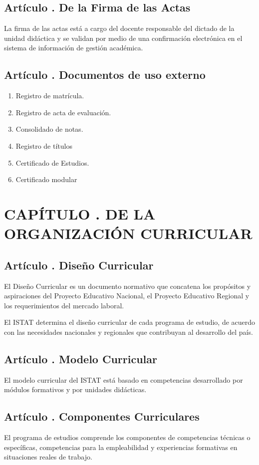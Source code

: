 \subsection{Artículo . De la Firma de las Actas}
\addtocounter{ns}{1}
La firma de las actas está a cargo del docente responsable del dictado de la unidad didáctica y se validan por medio de una confirmación electrónica en el sistema de información de gestión académica. 
\subsection{Artículo . Documentos de uso externo}
\addtocounter{ns}{1}
\begin{enumerate}
\item Registro de matrícula. 
\item Registro de acta de evaluación. 
\item Consolidado de notas. 
\item Registro de títulos 
\item Certificado de Estudios. 
\item Certificado modular
\end{enumerate}
\section{CAPÍTULO . DE LA ORGANIZACIÓN CURRICULAR}
\addtocounter{re}{1}

\subsection{Artículo . Diseño Curricular}
\addtocounter{ns}{1}
El Diseño Curricular es un documento normativo que concatena los propósitos y aspiraciones del Proyecto Educativo Nacional, el Proyecto Educativo Regional y los requerimientos del mercado laboral. 

El ISTAT determina el diseño curricular de cada programa de estudio, de acuerdo con las necesidades nacionales y regionales que contribuyan al desarrollo del país. 
\subsection{Artículo . Modelo Curricular}
\addtocounter{ns}{1}
El modelo curricular del ISTAT está basado en competencias desarrollado por módulos formativos y por unidades didácticas.
\subsection{Artículo . Componentes Curriculares}
\addtocounter{ns}{1}
El programa de estudios comprende los componentes de competencias técnicas o específicas, competencias para la empleabilidad y experiencias formativas en situaciones reales de trabajo. 
